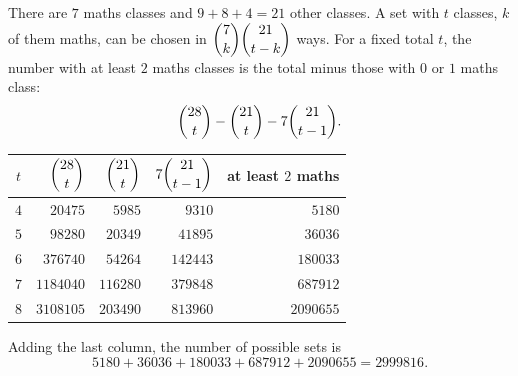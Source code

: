 There are $7$ maths classes and $9+8+4=21$ other classes. A set with $t$ classes, $k$ of them maths, can be chosen in $\dbinom7k\dbinom{21}{t-k}$ ways. For a fixed total $t$, the number with at least $2$ maths classes is the total minus those with $0$ or $1$ maths class:
\[\dbinom{28}{t}-\dbinom{21}{t}-7\dbinom{21}{t-1}.\]
\begin{center}
\begin{tabular}{c|r|r|r|r}
$t$ & $\dbinom{28}{t}$ & $\dbinom{21}{t}$ & $7\dbinom{21}{t-1}$ & at least $2$ maths\\[4pt]
\hline
$4$ & $20475$ & $5985$ & $9310$ & $5180$\\
$5$ & $98280$ & $20349$ & $41895$ & $36036$\\
$6$ & $376740$ & $54264$ & $142443$ & $180033$\\
$7$ & $1184040$ & $116280$ & $379848$ & $687912$\\
$8$ & $3108105$ & $203490$ & $813960$ & $2090655$
\end{tabular}
\end{center}
Adding the last column, the number of possible sets is
\[5180+36036+180033+687912+2090655=\boxed{2999816}.\]
